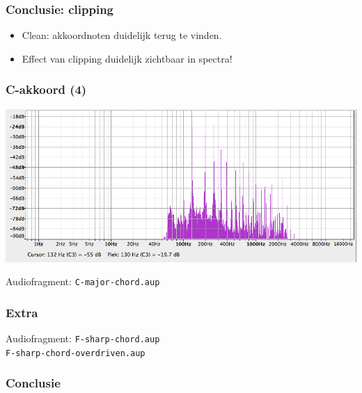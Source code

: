 \documentclass[compress, darktitle, framenumber]{beamer}
\begin{document}
\begin{frame}
\frametitle{Conclusie: clipping}
\begin{itemize}
\item Clean: akkoordnoten duidelijk terug te vinden. 
\item Effect van clipping duidelijk zichtbaar in spectra!
\end{itemize}
\end{frame}

\begin{frame}
\frametitle{C-akkoord (4)}
\includegraphics[width=\textwidth]{images/C-major-chord.png}
\begin{block}{Audiofragment:}
\texttt{C-major-chord.aup} 
\end{block}
\end{frame}


\begin{frame}
\frametitle{Extra}
\begin{block}{Audiofragment:}
\texttt{F-sharp-chord.aup} \\
\texttt{F-sharp-chord-overdriven.aup} \\
\end{block}
\end{frame}

\begin{frame}
\frametitle{Conclusie}
\end{frame}
\end{document}
